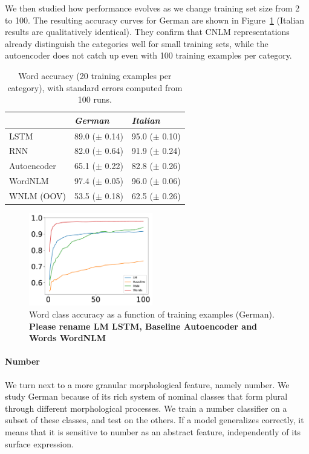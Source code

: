 We then studied how performance evolves as we change training set size from 2 to 100. The resulting accuracy curves for German are shown in Figure~\ref{fig:pos-induction} (Italian results are qualitatively identical). They confirm that CNLM representations already distinguish the categories well for small training sets, while the autoencoder does not catch up even with 100 training examples per category.

\begin{table}[t]
  \begin{center}
    \begin{tabular}{l|l|l}
   &\emph{German}&\emph{Italian}\\
      \hline
	    LSTM & 89.0 ($\pm$ 0.14) & 95.0 ($\pm$ 0.10) \\
	    RNN & 82.0 ($\pm$ 0.64) & 91.9 ($\pm$ 0.24) \\
	    Autoencoder & 65.1 ($\pm$ 0.22) & 82.8 ($\pm$ 0.26) \\
	    WordNLM & 97.4 ($\pm$ 0.05) & 96.0 ($\pm$ 0.06) \\
	    WNLM (OOV) & 53.5 ($\pm$ 0.18)  & 62.5 ($\pm$ 0.26) \\
    \end{tabular}
  \end{center}
  \caption{\label{tab:pos-results} Word  accuracy (20 training examples per category), with standard errors computed from 100 runs.}
\end{table}


\begin{figure}
\includegraphics[width=0.48\textwidth]{figures/german_pos_nouns_verbs.pdf}
	\caption{Word class accuracy as a function of training examples (German). \textbf{Please rename LM LSTM, Baseline Autoencoder and Words WordNLM}}\label{fig:pos-induction}
\end{figure}





\paragraph{Number}
We turn next to a more granular morphological feature, namely
number. We study German because of its rich system of nominal classes
that form plural through different morphological processes. We train a
number classifier on a subset of these classes, and test on the
others. If a model generalizes correctly, it means that it is
sensitive to number as an abstract feature, independently of its
surface expression.

